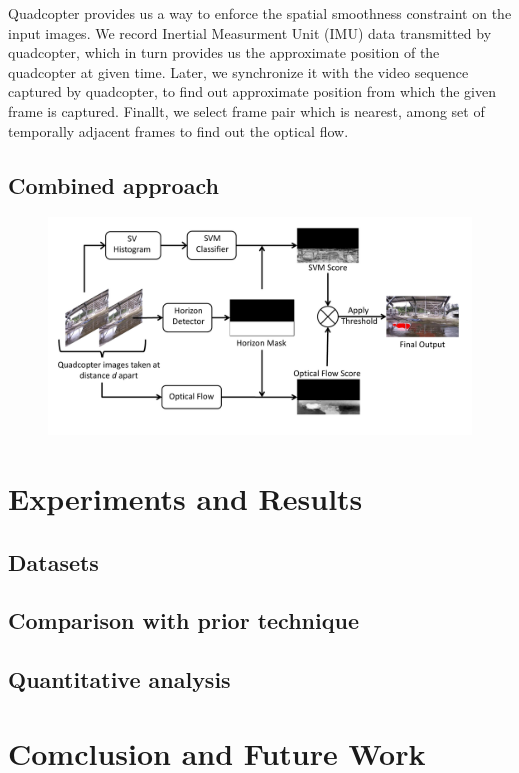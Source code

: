 \documentclass[times,10pt,twocolumn,letterpaper]{article}
\begin{document}
Quadcopter provides us a way to enforce the spatial smoothness constraint on
the input images. We record Inertial Measurment Unit (IMU) data
transmitted by quadcopter, which in turn provides us the approximate position of
the quadcopter at given time. Later, we synchronize it with the video sequence
captured by quadcopter, to find out approximate position from which the given
frame is captured. Finallt, we select frame pair which is nearest, among set of
temporally adjacent frames to find out the optical flow.
 
\subsection{Combined approach}
\begin{figure}[h!]
\centering
\includegraphics[width=\linewidth]{images/overall_workflow.pdf}
\caption{}
\label{fig:workflow}
\end{figure}


\section{Experiments and Results}
\subsection{Datasets}

\subsection{Comparison with prior technique}
\subsection{Quantitative analysis}
\section{Comclusion and Future Work}



\end{document}
